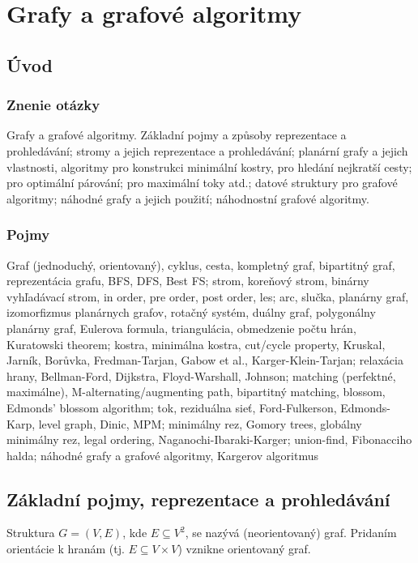 \section{Grafy a grafové algoritmy}

\subsection{Úvod}
\subsubsection*{Znenie otázky}
Grafy a grafové algoritmy. Základní pojmy a způsoby reprezentace
a prohledávání; stromy a jejich reprezentace a prohledávání; planární 
grafy a jejich vlastnosti, algoritmy pro konstrukci minimální kostry, 
pro hledání nejkratší cesty; pro optimální párování; pro maximální 
toky atd.; datové struktury pro grafové algoritmy; náhodné grafy a 
jejich použití; náhodnostní grafové algoritmy.

\subsubsection*{Pojmy}
Graf (jednoduchý, orientovaný), cyklus, cesta, kompletný graf,
bipartitný graf, reprezentácia grafu, BFS, DFS, Best FS; strom,
koreňový strom, binárny vyhľadávací strom, in order, pre order,
post order, les; arc, slučka, planárny graf, izomorfizmus planárnych
grafov, rotačný systém, duálny graf, polygonálny planárny graf,
Eulerova formula, triangulácia, obmedzenie počtu hrán, Kuratowski theorem;
kostra, minimálna kostra, cut/cycle property, Kruskal, Jarník, 
Borůvka, Fredman-Tarjan, Gabow et al., Karger-Klein-Tarjan;
relaxácia hrany, Bellman-Ford, Dijkstra, Floyd-Warshall, Johnson;
matching (perfektné, maximálne), M-alternating/augmenting path,
bipartitný matching, blossom, Edmonds' blossom algorithm;
tok, reziduálna sieť, Ford-Fulkerson, Edmonds-Karp, level graph,
Dinic, MPM; minimálny rez, Gomory trees, globálny minimálny rez,
legal ordering, Naganochi-Ibaraki-Karger;
union-find, Fibonacciho halda; náhodné grafy a grafové algoritmy,
Kargerov algoritmus

\subsection{Základní pojmy, reprezentace a prohledávání}

Struktura $G = (V, E)$, kde $E \subseteq V^2$, se nazývá (neorientovaný) graf.
Pridaním orientácie k hranám (tj. $E \subseteq V \times V$) vznikne orientovaný graf.

